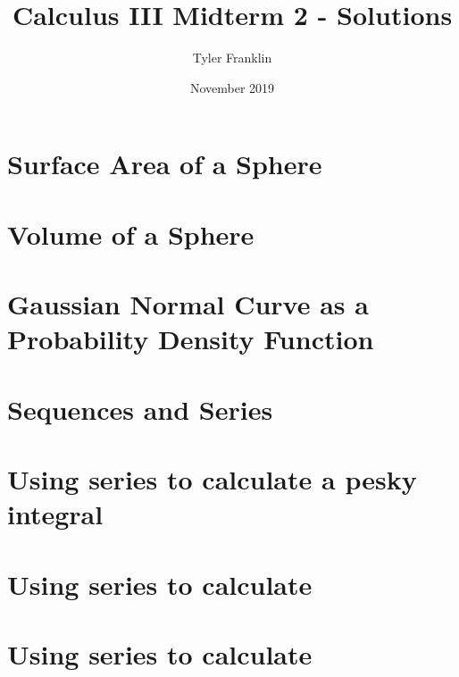 \documentclass{article}
\title{Calculus III Midterm 2 - Solutions}
\author{Tyler Franklin}
\date{November 2019}
\begin{document}
\maketitle

\section{Surface Area of a Sphere}

\section{Volume of a Sphere}

\section{Gaussian Normal Curve as a Probability Density Function}

\section{Sequences and Series}

\section{Using series to calculate a pesky integral}

\section{Using series to calculate \pi}

\section{Using series to calculate}
\end{document}
